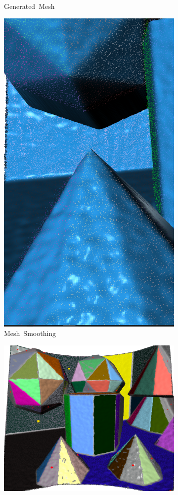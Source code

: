 \begin{figure}[ht]
\begin{subfigure}[t]{.23\linewidth}
    \caption{\label{fig:ch3_synpeb_b}Generated~Mesh}
  \end{subfigure}
  \begin{subfigure}[t]{.23\linewidth}
    \centering\includegraphics[width=.75\linewidth]{chapter_3_polylidar3d/imgs/synpeb_var4_mesh_smooth_cropped.png}
    \caption{\label{fig:ch3_synpeb_c}Mesh~Smoothing}
  \end{subfigure}
  \par\bigskip
    \centering
  \begin{subfigure}[t]{.45\linewidth}
    \centering\includegraphics[width=.75\linewidth]{chapter_3_polylidar3d/imgs/synpeb_var4_planes_cropped_change.png}

\end{subfigure}
\end{figure}
